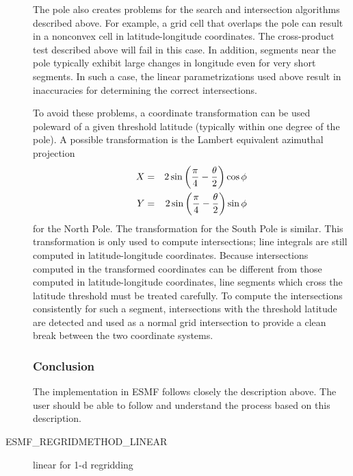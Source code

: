 \begin{description}
     The pole also creates problems for the search and intersection algorithms
     described above.  For example, a grid cell that overlaps the pole can
     result in a nonconvex cell in latitude-longitude coordinates.  The
     cross-product test described above will fail in this case.  In addition,
     segments near the pole typically exhibit large changes in longitude even
     for very short segments.  In such a case, the linear parametrizations used
     above result in inaccuracies for determining the correct intersections.

     To avoid these problems, a coordinate transformation can be used poleward
     of a given threshold latitude (typically within one degree of the pole).
     A possible transformation is the Lambert equivalent azimuthal projection
\begin{eqnarray}
X &=& 2\sin\left({\pi \over 4} - {\theta \over 2}\right)\cos\phi \nonumber \\
Y &=& 2\sin\left({\pi \over 4} - {\theta \over 2}\right)\sin\phi 
\end{eqnarray}
     for the North Pole.  The transformation for the South Pole is similar.
     This transformation is only used to compute intersections; line integrals
     are still computed in latitude-longitude coordinates.  Because intersections
     computed in the transformed coordinates can be different from those computed
     in latitude-longitude coordinates, line segments which cross the latitude
     threshold must be treated carefully.  To compute the intersections
     consistently for such a segment, intersections with the threshold latitude
     are detected and used as a normal grid intersection to provide a clean break
     between the two coordinate systems.

\subsubsection{Conclusion}

     The implementation in ESMF follows closely the description above.  The user
     should be able to follow and understand the process based on this
     description.

\item[ESMF\_REGRIDMETHOD\_LINEAR  ] linear for 1-d regridding

\end{description}

